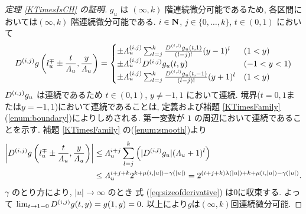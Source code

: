 \begin{proof}[\rm 定理 \ref{KTimesIsCH} の証明]
 $g_u$ は $(\infty, k)$ 階連続微分可能であるため,
 各区間においては$(\infty, k)$ 階連続微分可能である.
 $i \in \mathbf N$, $j \in \{0, \dots, k\}$, $t \in (0, 1)$ において
\begin{equation}
   D^{(i, j)}g \left(l^\mp_u \pm \frac{t}{\varLambda_u}, \frac{y}{\varLambda_u}\right)
   = \begin{cases}
      \pm \varLambda_u^{(i, j)} \sum^{k}_{l=j} \frac{D^{(i,l)} g_u(t,1)}{(l-j)!}
      (y - 1)^l &  (1<y)
      \\
      \pm \varLambda_u^{(i,j)} D^{(i, j)} g_u(t, y) & (-1 < y < 1)
      \\
      \pm \varLambda_u^{(i, j)} \sum^{k}_{l=j} 
      \frac{D^{(i,l)} g_u(t, -1)}{(l-j)!} (y + 1)^l &  (1<y)
    \end{cases}
\end{equation}
 $D^{(i,j)}g_u$ は連続であるため 
 $t \in (0,1)$, $y \not = -1, 1$ において連続.
 境界($t = 0, 1$または$y = -1, 1$)において連続であることは,
 定義および補題 \ref{KTimesFamily} (\ref{enum:boundary})によりしめされる.
 第一変数が $1$ の周辺において連続であることを示す.
 補題 \ref{KTimesFamily} の(\ref{enum:smooth})より
 \begin{align}
  \left|D^{(i, j)}g \left(l^\mp_u \pm \frac{t}{\varLambda_u},
  \frac{y}{\varLambda_u}\right)\right|
  &\le 
  \varLambda_u^{i+j} \sum^{k}_{l=j} \left(|D^{(i,l)} g_u |(\varLambda_u + 1)^l \right)
\notag
  \\
  & \le \varLambda_u^{i+j+k}  2^{k + \mu(i, |u|) - \gamma(|u|)}
   =  2^{(i+j+k)\lambda(|u|) + k + \mu(i, |u|)  - \gamma(|u|)}. 
  \label{eq:sizeofderivative}
 \end{align}
 $\gamma$ のとり方により, $|u| \to \infty$ のとき 
 式 (\ref{eq:sizeofderivative}) は$0$に収束する.
 よって  $\lim_{t \to 1-0}D^{(i,j)} g(t,y) = g(1, y) = 0$.
 以上により$g$は$(\infty, k)$回連続微分可能.
\end{proof}



